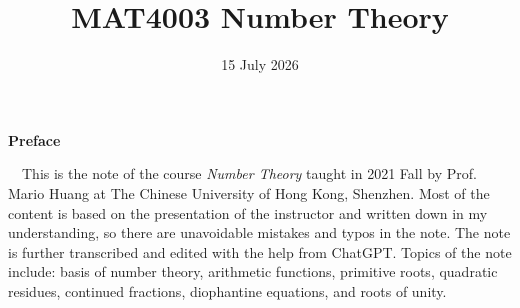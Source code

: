 \documentclass[12pt,openany]{book}
\title{MAT4003 Number Theory}
\author{}
\date{15 July 2026}
\begin{document}
	\maketitle
	\allowdisplaybreaks
	\begin{center}
		\Large\textbf{Preface}
    \end{center}~\
    This is the note of the course \textit{Number Theory} taught in 2021 Fall by Prof. Mario Huang at The Chinese University of Hong Kong, Shenzhen. Most of the content is based on the presentation of the instructor and written down in my understanding, so there are unavoidable mistakes and typos in the note. The note is further transcribed and edited with the help from ChatGPT. Topics of the note include: basis of number theory, arithmetic functions, primitive roots, quadratic residues, continued fractions, diophantine equations, and roots of unity.

	\tableofcontents

\setcounter{chapter}{-1}









\end{document}
